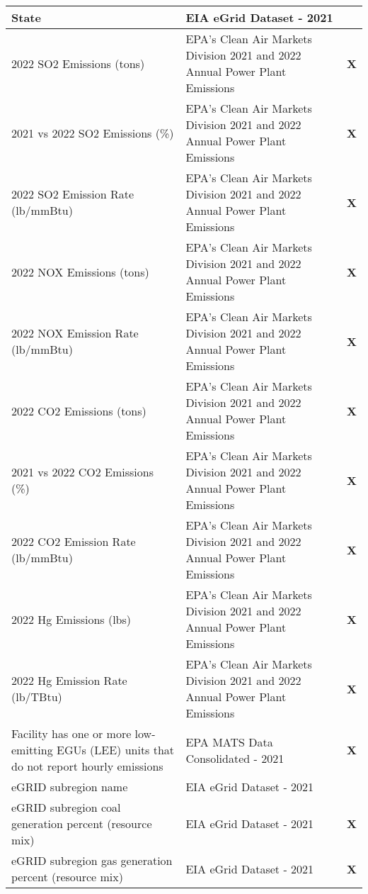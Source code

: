 \begin{table}[H]
\begin{adjustbox}{width=\textwidth}
\begin{tabular}{|l | l | l |}
        \midrule
        State & EIA eGrid Dataset - 2021 & \\
        \midrule
        2022 SO2 Emissions (tons) & EPA's Clean Air Markets Division 2021 and 2022 Annual Power Plant Emissions & \textbf{X} \\
        \midrule
        2021 vs 2022 SO2 Emissions (\%) & EPA's Clean Air Markets Division 2021 and 2022 Annual Power Plant Emissions & \textbf{X} \\
        \midrule
        2022 SO2 Emission Rate (lb/mmBtu) & EPA's Clean Air Markets Division 2021 and 2022 Annual Power Plant Emissions & \textbf{X} \\
        \midrule
        2022 NOX Emissions (tons) & EPA's Clean Air Markets Division 2021 and 2022 Annual Power Plant Emissions & \textbf{X} \\
        \midrule
        2022 NOX Emission Rate (lb/mmBtu) & EPA's Clean Air Markets Division 2021 and 2022 Annual Power Plant Emissions & \textbf{X} \\
        \midrule
        2022 CO2 Emissions (tons) & EPA's Clean Air Markets Division 2021 and 2022 Annual Power Plant Emissions & \textbf{X} \\
        \midrule
        2021 vs 2022 CO2 Emissions (\%) & EPA's Clean Air Markets Division 2021 and 2022 Annual Power Plant Emissions & \textbf{X} \\
        \midrule
        2022 CO2 Emission Rate (lb/mmBtu) & EPA's Clean Air Markets Division 2021 and 2022 Annual Power Plant Emissions & \textbf{X} \\
        \midrule
        2022 Hg Emissions (lbs) & EPA's Clean Air Markets Division 2021 and 2022 Annual Power Plant Emissions & \textbf{X} \\
        \midrule
        2022 Hg Emission Rate (lb/TBtu) & EPA's Clean Air Markets Division 2021 and 2022 Annual Power Plant Emissions & \textbf{X} \\
        \midrule
        Facility has one or more low-emitting EGUs (LEE) units that do not report hourly emissions & EPA MATS Data Consolidated - 2021 & \textbf{X} \\
        \midrule
        eGRID subregion name & EIA eGrid Dataset - 2021 & \\
        \midrule
        eGRID subregion coal generation percent (resource mix) & EIA eGrid Dataset - 2021 & \textbf{X} \\
        \midrule
        eGRID subregion gas generation percent (resource mix) & EIA eGrid Dataset - 2021 & \textbf{X} \\

\end{tabular}
\end{adjustbox}
\end{table}
